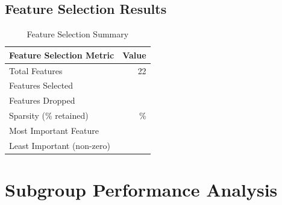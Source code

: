 \subsection{Feature Selection Results}

\begin{table}[h]
\centering
\caption{Feature Selection Summary}
\begin{tabular}{lr}
\toprule
\textbf{Feature Selection Metric} & \textbf{Value} \\
\midrule
Total Features & 22 \\
Features Selected & \ModelSixFeaturesSelected{} \\
Features Dropped & \ModelSixFeaturesDropped{} \\
Sparsity (\% retained) & \ModelSixSparsityPercent{}\% \\
Most Important Feature & \ModelSixMostImportant{} \\
Least Important (non-zero) & \ModelSixLeastImportant{} \\
\bottomrule
\end{tabular}
\end{table}

\section{Subgroup Performance Analysis}

